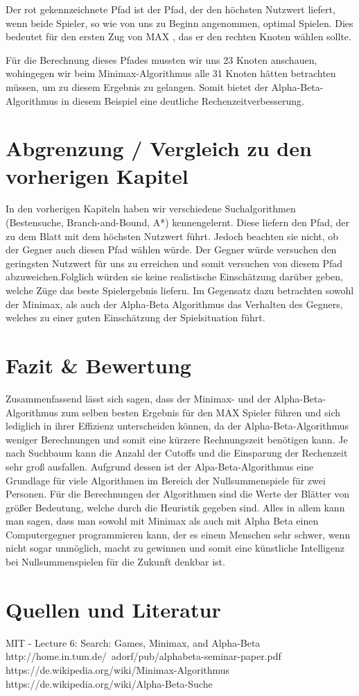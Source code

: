  Der rot gekennzeichnete Pfad ist der Pfad, der den höchsten Nutzwert liefert, wenn beide Spieler, so wie von uns zu Beginn angenommen, optimal Spielen. Dies bedeutet für den ersten Zug von MAX , das er den rechten Knoten wählen sollte.
 \newline

 Für die Berechnung dieses Pfades mussten wir uns 23 Knoten anschauen, wohingegen wir beim Minimax-Algorithmus alle 31 Knoten hätten betrachten müssen, um zu diesem Ergebnis zu gelangen. Somit bietet der Alpha-Beta-Algorithmus in diesem Beispiel eine deutliche Rechenzeitverbesserung.



\section{Abgrenzung / Vergleich zu den vorherigen Kapitel}

In den vorherigen Kapiteln haben wir verschiedene Suchalgorithmen (Bestensuche, Branch-and-Bound, A*) kennengelernt. Diese liefern den Pfad, der zu dem Blatt mit dem höchsten Nutzwert führt. Jedoch beachten sie nicht, ob der Gegner auch diesen Pfad wählen würde. Der Gegner würde versuchen den geringsten Nutzwert für uns zu erreichen und somit versuchen von diesem Pfad abzuweichen.Folglich würden sie keine realistische Einschätzung darüber geben, welche Züge das beste Spielergebnis liefern. Im Gegensatz dazu betrachten sowohl der Minimax, als auch der Alpha-Beta Algorithmus das Verhalten des Gegners, welches zu einer guten Einschätzung der Spielsituation führt.



\section{Fazit \& Bewertung}

Zusammenfassend lässt sich sagen, dass der Minimax- und der Alpha-Beta-Algorithmus zum selben besten Ergebnis für den MAX Spieler führen und sich lediglich in ihrer Effizienz unterscheiden können, da der Alpha-Beta-Algorithmus weniger Berechnungen und somit eine kürzere Rechnungszeit benötigen kann. Je nach Suchbaum kann die Anzahl der Cutoffs und die Einsparung der Rechenzeit sehr groß ausfallen. Aufgrund dessen ist der Alpa-Beta-Algorithmus eine Grundlage für viele Algorithmen im Bereich der Nullsummenspiele für zwei Personen. Für die Berechnungen der Algorithmen sind die Werte der Blätter von größer Bedeutung, welche durch die Heuristik gegeben sind. Alles in allem kann man sagen, dass man sowohl mit Minimax als auch mit Alpha Beta einen Computergegner programmieren kann, der es einem Menschen sehr schwer, wenn nicht sogar unmöglich, macht zu gewinnen und somit eine künstliche Intelligenz bei Nullsummenspielen für die Zukunft denkbar ist.



\section{Quellen und Literatur}

MIT - Lecture 6: Search: Games, Minimax, and Alpha-Beta\\
http://home.in.tum.de/~adorf/pub/alphabeta-seminar-paper.pdf\\
https://de.wikipedia.org/wiki/Minimax-Algorithmus\\
https://de.wikipedia.org/wiki/Alpha-Beta-Suche


